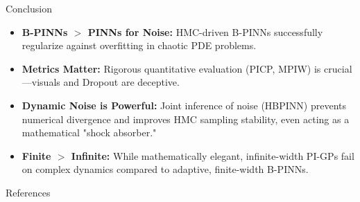 \documentclass[10pt, aspectratio=169]{beamer}
\begin{document}
  

\begin{frame}{Conclusion}
    \begin{itemize}
        \item \textbf{B-PINNs $>$ PINNs for Noise:} HMC-driven B-PINNs successfully regularize against overfitting in chaotic PDE problems.
        \item \textbf{Metrics Matter:} Rigorous quantitative evaluation (PICP, MPIW) is crucial—visuals and Dropout are deceptive.
        \item \textbf{Dynamic Noise is Powerful:} Joint inference of noise (HBPINN) prevents numerical divergence and improves HMC sampling stability, even acting as a mathematical "shock absorber."
        \item \textbf{Finite $>$ Infinite:} While mathematically elegant, infinite-width PI-GPs fail on complex dynamics compared to adaptive, finite-width B-PINNs.
    \end{itemize}
\end{frame}


\begin{frame}[allowframebreaks]{References}
    
    
\end{frame}
\end{document}
